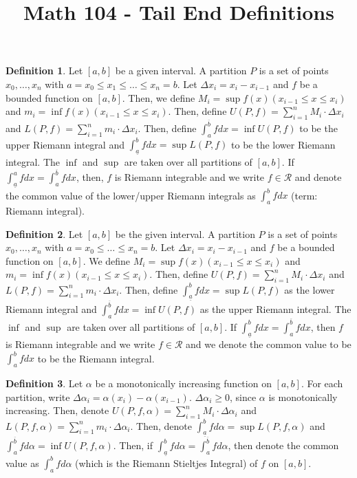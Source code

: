 \documentclass[12pt]{article}
\theoremstyle{definition}
\newtheorem{definition}{Definition}
\theoremstyle{named}
\begin{document}
\title{Math 104 - Tail End Definitions}
\author{}
\date{}
\maketitle
\date

\renewcommand{\thedefinition}{6.1}
\begin{definition}
    Let $[a,b]$ be a given interval. A partition $P$ is a set of points $x_0, \dots, x_n$ with $a = x_0 \leq x_1 \leq \dots \leq x_n = b$. Let $\Delta x_i = x_i - x_{i-1}$ and $f$ be a bounded function on $[a,b]$. Then, we define $M_i = \sup f(x) (x_{i-1} \leq x \leq x_i)$ and $m_i = \inf f(x) (x_{i-1} \leq x \leq x_i)$. Then, define $U(P,f) = \sum_{i=1}^{n} M_i \cdot \Delta x_i$ and $L(P,f) = \sum_{i=1}^{n} m_i \cdot \Delta x_i$. Then, define $\int_{a}^{\overline{b}} f dx = \inf U(P,f)$ to be the upper Riemann integral and $\int_{\underline{a}}^{b} f dx = \sup L(P,f)$ to be the lower Riemann integral. The $\inf$ and $\sup$ are taken over all partitions of $[a,b]$. If $\int_{\underline{a}}^{a} f dx = \int_{a}^{\overline{b}} f dx$, then, $f$ is Riemann integrable and we write $f \in \mathscr{R}$ and denote the common value of the lower/upper Riemann integrals as $\int_{a}^{b} f dx$ (term: Riemann integral). 
\end{definition}

\renewcommand{\thedefinition}{6.1}
\begin{definition}
    Let $[a,b]$ be the given interval. A partition $P$ is a set of points $x_0, \dots, x_n$ with $a=x_0 \leq \dots \leq x_n = b$. Let $\Delta x_i = x_i - x_{i-1}$ and $f$ be a bounded function on $[a,b]$. We define $M_i = \sup f(x) (x_{i-1} \leq x \leq x_i)$ and $m_i = \inf f(x) (x_{i-1} \leq x \leq x_i)$. Then, define $U(P,f) = \sum_{i=1}^{n} M_i \cdot \Delta x_i$ and $L(P,f) = \sum_{i=1}^{n} m_i \cdot \Delta x_i$. Then, define $\int_{\underline{a}}^{b} f dx = \sup L(P,f)$ as the lower Riemann integral and $\int_{a}^{\overline{b}} f dx = \inf U(P,f)$ as the upper Riemann integral. The $\inf$ and $\sup$ are taken over all partitions of $[a,b]$. If $\int_{\underline{a}}^{b} f dx = \int_{a}^{\overline{b}} f dx$, then $f$ is Riemann integrable and we write $f\in\mathscr{R}$ and we denote the common value to be $\int_{a}^{b} f dx$ to be the Riemann integral. 
\end{definition}

\renewcommand{\thedefinition}{6.2}
\begin{definition}
    Let $\alpha$ be a monotonically increasing function on $[a,b]$. For each partition, write $\Delta \alpha_i = \alpha(x_i) - \alpha(x_{i-1})$. $\Delta \alpha_i \geq 0$, since $\alpha$ is monotonically increasing. Then, denote $U(P,f,\alpha) = \sum_{i=1}^{n} M_i \cdot \Delta \alpha_i$ and $L(P,f,\alpha) = \sum_{i=1}^{n} m_i \cdot \Delta \alpha_i$. Then, denote $\int_{\underline{a}}^{b} f d\alpha = \sup L(P,f,\alpha)$ and $\int_{a}^{\overline{b}} f d\alpha = \inf U(P,f,\alpha)$. Then, if $\int_{\underline{a}}^{b} f d\alpha = \int_{a}^{\overline{b}} f d\alpha$, then denote the common value as $\int_{a}^{b} f d\alpha$ (which is the Riemann Stieltjes Integral) of $f$ on $[a,b]$. 
\end{definition}
\end{document}
